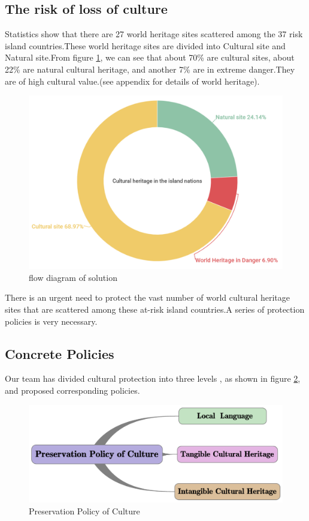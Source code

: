 \documentclass[12pt]{article}  %
\begin{document}
\subsection{The risk of loss of culture}
Statistics show that there are 27 world heritage sites scattered among the 37 risk island countries.These world heritage sites are divided into Cultural site and Natural site.From figure \ref{culture site}, we can see that about 70\% are cultural sites, about 22\% are natural cultural heritage, and another 7\% are in extreme danger.They are of high cultural value.(see appendix for details of world heritage).

\begin{figure}[htbp]
	\centering
	\includegraphics[width=.8\textwidth]{culture site.png}
	\caption{ flow diagram of solution}\label{culture site}
\end{figure}

There is an urgent need to protect the vast number of world cultural heritage sites that are scattered among these at-risk island countries.A series of protection policies is very necessary.



\subsection{Concrete Policies}
Our team has divided cultural protection into three levels , as shown in figure \ref{culture 3 levels}, and proposed corresponding policies.

\begin{figure}[htbp]
	\centering
	\includegraphics[width=.8\textwidth]{culture 3 levels.png}
	\caption{ Preservation Policy of Culture}\label{culture 3 levels}
\end{figure}
\end{document}
